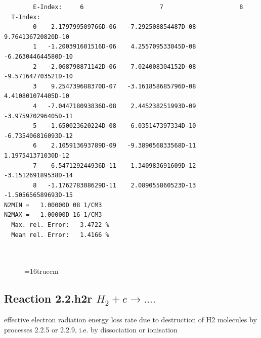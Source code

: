 \documentclass[12pt,dvipdfmx]{article}
\begin{document}
\begin{small}
\begin{verbatim}
        E-Index:     6                     7                     8
  T-Index:
        0    2.179799509766D-06   -7.292508854487D-08    9.764136720820D-10
        1   -1.200391601516D-06    4.255709533045D-08   -6.263044644580D-10
        2   -2.068798871142D-06    7.024008304152D-08   -9.571647703521D-10
        3    9.254739688370D-07   -3.161858685796D-08    4.410801074405D-10
        4   -7.044718093836D-08    2.445238251993D-09   -3.975970296405D-11
        5   -1.650023620224D-08    6.035147397334D-10   -6.735406816093D-12
        6    2.105913693789D-09   -9.389056833568D-11    1.197541371030D-12
        7    6.547129244936D-11    1.340983691609D-12   -3.151269189538D-14
        8   -1.176278308629D-11    2.089055860523D-13   -1.505656589693D-15
N2MIN =   1.00000D 08 1/CM3
N2MAX =   1.00000D 16 1/CM3
  Max. rel. Error:   3.4722 %
  Mean rel. Error:   1.4166 %



\end{verbatim}\end{small}
\begin{figure} \label{2.2.h2c}
\epsfxsize=16truecm
\end{figure}
\newpage

\subsection{
  Reaction 2.2.h2r $H_2 + e \rightarrow  ....$
}

   effective electron radiation energy loss rate due to destruction of H2 molecules by
   processes 2.2.5 or 2.2.9, i.e. by dissociation or ionisation
\end{document}
